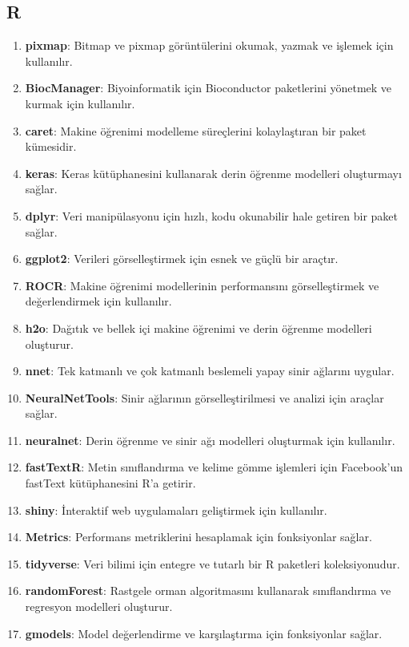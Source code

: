 \subsection{R}
\begin{enumerate}
    \item \textbf{pixmap}: Bitmap ve pixmap görüntülerini okumak, yazmak ve işlemek için kullanılır.
    \item \textbf{BiocManager}: Biyoinformatik için Bioconductor paketlerini yönetmek ve kurmak için kullanılır.
    \item \textbf{caret}: Makine öğrenimi modelleme süreçlerini kolaylaştıran bir paket kümesidir.
    \item \textbf{keras}: Keras kütüphanesini kullanarak derin öğrenme modelleri oluşturmayı sağlar.
    \item \textbf{dplyr}: Veri manipülasyonu için hızlı, kodu okunabilir hale getiren bir paket sağlar.
    \item \textbf{ggplot2}: Verileri görselleştirmek için esnek ve güçlü bir araçtır.
    \item \textbf{ROCR}: Makine öğrenimi modellerinin performansını görselleştirmek ve değerlendirmek için kullanılır.
    \item \textbf{h2o}: Dağıtık ve bellek içi makine öğrenimi ve derin öğrenme modelleri oluşturur.
    \item \textbf{nnet}: Tek katmanlı ve çok katmanlı beslemeli yapay sinir ağlarını uygular.
    \item \textbf{NeuralNetTools}: Sinir ağlarının görselleştirilmesi ve analizi için araçlar sağlar.
    \item \textbf{neuralnet}: Derin öğrenme ve sinir ağı modelleri oluşturmak için kullanılır.
    \item \textbf{fastTextR}: Metin sınıflandırma ve kelime gömme işlemleri için Facebook'un fastText kütüphanesini R'a getirir.
    \item \textbf{shiny}: İnteraktif web uygulamaları geliştirmek için kullanılır.
    \item \textbf{Metrics}: Performans metriklerini hesaplamak için fonksiyonlar sağlar.
    \item \textbf{tidyverse}: Veri bilimi için entegre ve tutarlı bir R paketleri koleksiyonudur.
    \item \textbf{randomForest}: Rastgele orman algoritmasını kullanarak sınıflandırma ve regresyon modelleri oluşturur.
    \item \textbf{gmodels}: Model değerlendirme ve karşılaştırma için fonksiyonlar sağlar.

\end{enumerate}
